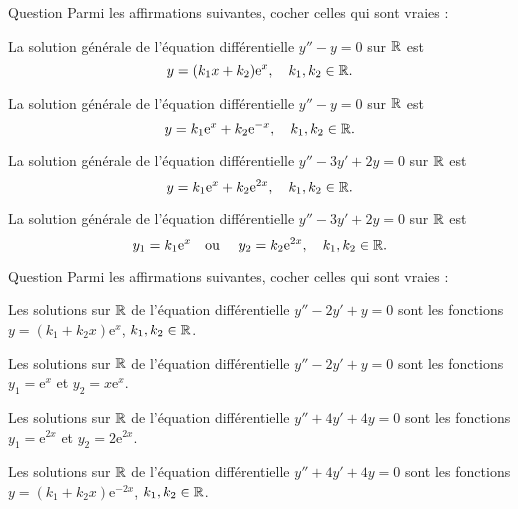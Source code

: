 \begin{multi}[multiple,feedback=
{Les solutions de l'équation caractéristique \(r^2-1=0\) sont \(\pm 1\). Donc la solution générale de \(y''-y=0\) est \(y=k_1\mathrm{e}^{x}+k_2\mathrm{e}^{-x}\), \(k_1,k_2\in \Rr\).
\vskip0mm
\noindent Les solutions de l'équation caractéristique \(r^2-3r+2=0\) sont \(1\) et \(2\). Donc la solution générale de \(y''-3y'+2y=0\) est \(y=k_1\mathrm{e}^{x}+k_2\mathrm{e}^{2x}\), \(k_1,k_2\in \Rr\).
}]{Question}
Parmi les affirmations suivantes, cocher celles qui sont vraies :

    \item La solution générale de l'équation différentielle \(y''-y=0\) sur \(\mathbb{R}\) est
\[\displaystyle y=(k_1x+k_2)\mathrm{e}^{x},\quad k_1,k_2\in \mathbb{R}.\]
    \item* La solution générale de l'équation différentielle \(y''-y=0\) sur \(\mathbb{R}\) est
\[\displaystyle y=k_1\mathrm{e}^{x}+k_2\mathrm{e}^{-x},\quad k_1,k_2\in \mathbb{R}.\]
    \item* La solution générale de l'équation différentielle \(y''-3y'+2y=0\) sur \(\mathbb{R}\) est
\[\displaystyle y=k_1\mathrm{e}^{x}+k_2\mathrm{e}^{2x},\quad k_1,k_2\in \mathbb{R}.\]
    \item La solution générale de l'équation différentielle \(y''-3y'+2y=0\) sur \(\mathbb{R}\) est
\[\displaystyle y_1=k_1\mathrm{e}^{x}\quad \mbox{ou }\quad y_2=k_2\mathrm{e}^{2x},\quad k_1,k_2\in \mathbb{R}.\]
\end{multi}


\begin{multi}[multiple,feedback=
{L'équation caractéristique \(r^2-2r+1=0\) admet \(1\) comme racine double. Donc la solution générale de \(y''-2y'+y=0\) est \(y=(k_1+k_2x)\mathrm{e}^{x}\), \(k_1,k_2\in \Rr\).
\vskip0mm
L'équation caractéristique \(r^2+4r+4=0\) admet \(-2\) comme racine double. Donc la solution générale de \(y''+4y'+4y=0\) est \(y=(k_1+k_2x)\mathrm{e}^{-2x}\), \(k_1,k_2\in \Rr\).
}]{Question}
Parmi les affirmations suivantes, cocher celles qui sont vraies :

    \item* Les solutions sur \(\mathbb{R}\) de l'équation différentielle \(y''-2y'+y=0\) sont les fonctions \(\displaystyle y=(k_1+k_2x)\mathrm{e}^{x}\), \(k_1,k_2\in \Rr\).
    \item Les solutions sur \(\mathbb{R}\) de l'équation différentielle \(y''-2y'+y=0\) sont les fonctions \(\displaystyle y_1=\mathrm{e}^{x}\) et \(\displaystyle y_2=x\mathrm{e}^{x}\).
    \item Les solutions sur \(\mathbb{R}\) de l'équation différentielle \(y''+4y'+4y=0\) sont les fonctions \(\displaystyle y_1=\mathrm{e}^{2x}\) et \(y_2=2\mathrm{e}^{2x}\).
    \item* Les solutions sur \(\mathbb{R}\) de l'équation différentielle \(y''+4y'+4y=0\) sont les fonctions \(\displaystyle y=(k_1+k_2x)\mathrm{e}^{-2x}\), \(k_1,k_2\in \Rr\).
\end{multi}


